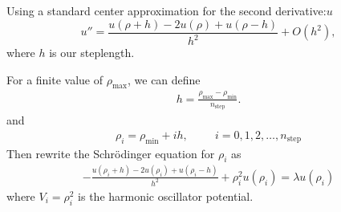 \documentclass[11pt,a4paper,english,draft]{article}
\numberwithin{equation}{section}
\begin{document}
Using a standard center approximation for the second derivative:$u$
\begin{equation}
    u''=\frac{u(\rho+h) -2u(\rho) +u(\rho-h)}{h^2} +O(h^2),
    \label{eq:diffoperation}
\end{equation} 
where $h$ is our steplength.

For a finite value of $\rho_{\mathrm{max}}$, we can define 
\begin{gather}
  h=\frac{\rho_{\mathrm{max}}-\rho_{\mathrm{min}} }{n_{\mathrm{step}}}.
\end{gather}
and 
\begin{gather}
    \rho_i= \rho_{\mathrm{min}} + ih, \hspace{1cm} i=0,1,2,\dots ,
    n_{\mathrm{step}}
\end{gather}
Then rewrite the Schrödinger equation for $\rho_i$ as
\begin{gather}
-\frac{u(\rho_i+h) -2u(\rho_i) +u(\rho_i-h)}{h^2}+\rho_i^2u(\rho_i) 
= \lambda u(\rho_i)
\end{gather}
where $V_i=\rho_i^2$ is the harmonic oscillator potential.
\end{document}
